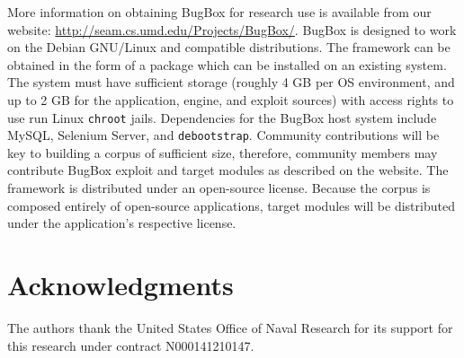 \documentclass[letterpaper,twocolumn,10pt]{article}
\begin{document}
More information on obtaining BugBox for research use is available from our website: \url{http://seam.cs.umd.edu/Projects/BugBox/}. BugBox is designed to work on the Debian GNU/Linux and compatible distributions. The framework can be obtained in the form of a package which can be installed on an existing system. The system must have sufficient storage (roughly 4 GB per OS environment, and up to 2 GB for the application, engine, and exploit sources) with access rights to use run Linux {\tt chroot} jails.  Dependencies for the BugBox host system include MySQL, Selenium Server, and \texttt{debootstrap}. Community contributions will be key to building a corpus of sufficient size, therefore, community members may contribute BugBox exploit and target modules as described on the website. The framework is distributed under an open-source license. Because the corpus is composed entirely of open-source applications, target modules will be distributed under the application's respective license.

\section*{Acknowledgments}

The authors thank the United States Office of Naval Research for its support for this research under contract N000141210147.

{\footnotesize 
}
\end{document}
